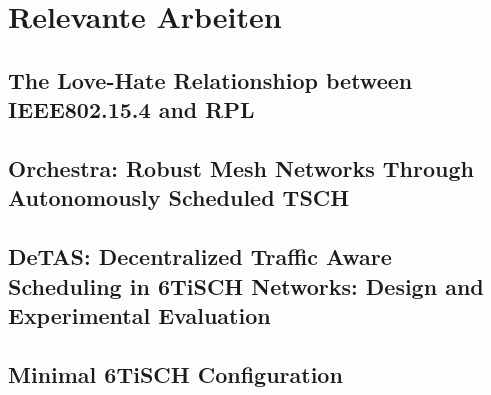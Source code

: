 \section{Relevante Arbeiten}
\label{sec:relevante_arbeiten}

\subsection{The Love-Hate Relationshiop between IEEE802.15.4 and RPL}
\label{subsec:ra_love-hate}

\subsection{Orchestra: Robust Mesh Networks Through Autonomously Scheduled TSCH}
\label{subsec:ra_orchestra}

\subsection{DeTAS: Decentralized Traffic Aware Scheduling in 6TiSCH Networks:
Design and Experimental Evaluation}
\label{subsec:ra_detas}

\subsection{Minimal 6TiSCH Configuration}
\label{subsec:ra_minimal_6tisch}
